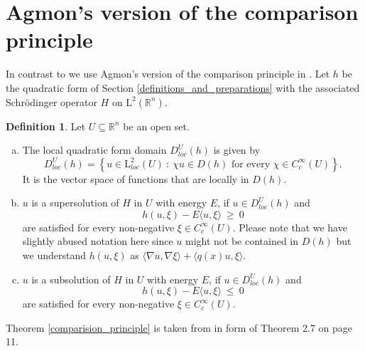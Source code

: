 \documentclass[12pt,longbibliography]{article}
\def\R{\mathbb{R}}
\theoremstyle{definition}
\newtheorem{dfn}[thm]{Definition}
\theoremstyle{remark}
\theoremstyle{example}
\begin{document}
\newpage

\appendix

\section{Agmon's version of the comparison principle}

In contrast to \cite{AlziaryTakac09} we use Agmon's version of the comparison principle in \cite{Hundertmark_Jex_Lange_2023}. 
Let $h$ be the quadratic form of Section \ref{definitions_and_preparations} 
with the associated Schrödinger operator $H$ on $\mathrm{L}^{2} \left( \R^{n} \right)$.\\

\begin{dfn} \label{Definition_sub_supersolution}
Let $U \subseteq \R^{n}$ be an open set.
\begin{enumerate}[a)]
\item The local quadratic form domain $D_{loc}^{U}(h)$ is given by
\begin{equation}
D_{loc}^{U}(h) = \left\{ u \in \mathrm{L}^{2}_{loc} \left( U \right) \ : \ \chi u \in D(h) \text{ for every } 
\chi \in C_{c}^{\infty}\left( U \right) \right\}.
\end{equation}
It is the vector space of functions that are locally in $D(h)$.
\item $u$ is a supersolution of $H$ in $U$ with energy $E$, if $u \in D_{loc}^{U}(h)$ and
\begin{equation}
h\left( u, \xi \right) - E \langle u, \xi  \rangle \ \geq \ 0 
\end{equation}
are satisfied for every non-negative $\xi \in C_{c}^{\infty}\left( U \right)$. Please note that we have slightly abused 
notation here since $u$ might not be contained in $D(h)$ but we understand  
$h\left( u, \xi \right)$ as 
$\langle \nabla u, \nabla \xi \rangle + \langle q(x)u, \xi \rangle$.
\item $u$ is a subsolution of $H$ in $U$ with energy $E$, if $u \in D_{loc}^{U}(h)$ and
\begin{equation}
h\left( u, \xi \right) - E \langle u, \xi  \rangle \ \leq \ 0 
\end{equation}
are satisfied for every non-negative $\xi \in C_{c}^{\infty}\left( U \right)$.\\
\end{enumerate}
\end{dfn}

Theorem \ref{comparision_principle} is taken from \cite{Hundertmark_Jex_Lange_2023} in form of
Theorem 2.7 on page 11. \\
\end{document}
